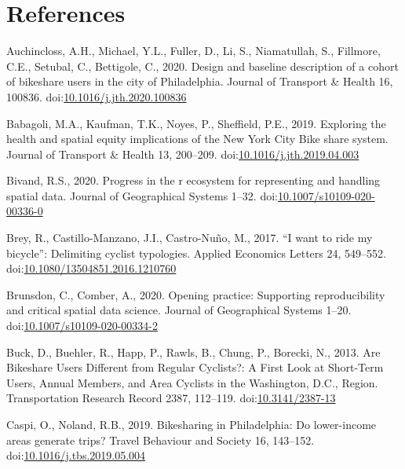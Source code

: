 \documentclass[]{elsarticle} %
\begin{document}
\hypertarget{references}{%
\section*{References}\label{references}}

\hypertarget{refs}{}
\leavevmode\hypertarget{ref-auchinclossDesignBaselineDescription2020}{}%
Auchincloss, A.H., Michael, Y.L., Fuller, D., Li, S., Niamatullah, S.,
Fillmore, C.E., Setubal, C., Bettigole, C., 2020. Design and baseline
description of a cohort of bikeshare users in the city of Philadelphia.
Journal of Transport \& Health 16, 100836.
doi:\href{https://doi.org/10.1016/j.jth.2020.100836}{10.1016/j.jth.2020.100836}

\leavevmode\hypertarget{ref-babagoliExploringHealthSpatial2019}{}%
Babagoli, M.A., Kaufman, T.K., Noyes, P., Sheffield, P.E., 2019.
Exploring the health and spatial equity implications of the New York
City Bike share system. Journal of Transport \& Health 13, 200--209.
doi:\href{https://doi.org/10.1016/j.jth.2019.04.003}{10.1016/j.jth.2019.04.003}

\leavevmode\hypertarget{ref-bivand2020progress}{}%
Bivand, R.S., 2020. Progress in the r ecosystem for representing and
handling spatial data. Journal of Geographical Systems 1--32.
doi:\href{https://doi.org/10.1007/s10109-020-00336-0}{10.1007/s10109-020-00336-0}

\leavevmode\hypertarget{ref-breyWantRideMy2017}{}%
Brey, R., Castillo-Manzano, J.I., Castro-Nuño, M., 2017. ``I want to
ride my bicycle'': Delimiting cyclist typologies. Applied Economics
Letters 24, 549--552.
doi:\href{https://doi.org/10.1080/13504851.2016.1210760}{10.1080/13504851.2016.1210760}

\leavevmode\hypertarget{ref-brunsdon2020opening}{}%
Brunsdon, C., Comber, A., 2020. Opening practice: Supporting
reproducibility and critical spatial data science. Journal of
Geographical Systems 1--20.
doi:\href{https://doi.org/10.1007/s10109-020-00334-2}{10.1007/s10109-020-00334-2}

\leavevmode\hypertarget{ref-buckAreBikeshareUsers2013}{}%
Buck, D., Buehler, R., Happ, P., Rawls, B., Chung, P., Borecki, N.,
2013. Are Bikeshare Users Different from Regular Cyclists?: A First Look
at Short-Term Users, Annual Members, and Area Cyclists in the
Washington, D.C., Region. Transportation Research Record 2387, 112--119.
doi:\href{https://doi.org/10.3141/2387-13}{10.3141/2387-13}

\leavevmode\hypertarget{ref-caspiBikesharingPhiladelphiaLowerincome2019}{}%
Caspi, O., Noland, R.B., 2019. Bikesharing in Philadelphia: Do
lower-income areas generate trips? Travel Behaviour and Society 16,
143--152.
doi:\href{https://doi.org/10.1016/j.tbs.2019.05.004}{10.1016/j.tbs.2019.05.004}
\end{document}
